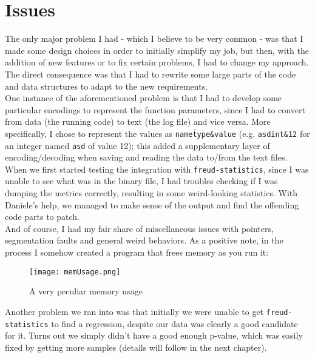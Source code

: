     \section{Issues}\label{sec:issues}

        The only major problem I had - which I believe to be very common - was that I made some
        design choices in order to initially simplify my job, but then, with the addition of
        new features or to fix certain problems, I had to change my approach. The direct consequence was that I
        had to rewrite some large parts of the code and data structures to adapt to the new requirements.\\
        
        One instance of the aforementioned problem is that I had to develop some particular encodings
        to represent the function parameters, since I had to convert from data (the running code) to text
        (the log file) and vice versa. More specifically, I chose to represent the values as 
        \texttt{name\=type\&value} (e.g. \texttt{asd\=int\&12} for an integer named \texttt{asd} of value 12);
        this added a supplementary layer of encoding/decoding when saving and reading the data to/from the
        text files.\\

        When we first started testing the integration with \texttt{freud-statistics}, since I was unable
        to see what was in the binary file, I had troubles checking if I was dumping the metrics correctly,
        resulting in some weird-looking statistics. With Daniele's help, we managed to make sense of
        the output and find the offending code parts to patch.\\

        And of course, I had my fair share of miscellaneous issues with pointers, segmentation faults and 
        general weird behaviors. As a positive note, in the process I somehow created a program that frees
        memory as you run it:

        \begin{figure}[H]
            \centering
            \texttt{[image: memUsage.png]}
            \caption{A very peculiar memory usage}
            \label{fig:memUsage}
        \end{figure}

        Another problem we ran into was that initially we were unable to get \texttt{freud-statistics} to find a
        regression, despite our data was clearly a good candidate for it. Turns out we simply didn't have a
        good enough p-value, which was easily fixed by getting more samples (details will follow in the next
        chapter).        


